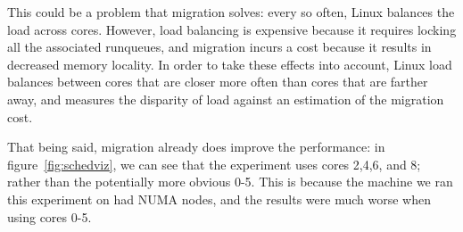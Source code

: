 This could be a problem that migration solves: every so often, Linux balances
the load across cores. However, load balancing is expensive because it requires
locking all the associated runqueues, and migration incurs a cost because it
results in decreased memory locality. In order to take these effects into
account, Linux load balances between cores that are closer more often than cores
that are farther away, and measures the disparity of load against an estimation
of the migration cost. 

That being said, migration already does improve the performance: in
figure~\ref{fig:schedviz}, we can see that the experiment uses cores 2,4,6, and
8; rather than the potentially more obvious 0-5. This is because the machine we
ran this experiment on had NUMA nodes, and the results were much worse when
using cores 0-5.


